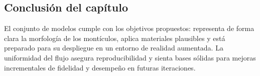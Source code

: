 \subsection{Conclusión del capítulo}

El conjunto de modelos cumple con los objetivos propuestos: representa de forma clara la morfología de los montículos, aplica materiales plausibles y está preparado para su despliegue en un entorno de realidad aumentada. La uniformidad del flujo asegura reproducibilidad y sienta bases sólidas para mejoras incrementales de fidelidad y desempeño en futuras iteraciones.